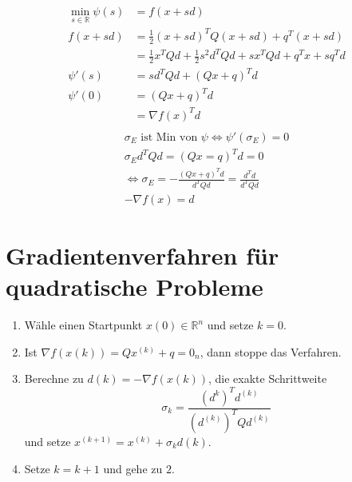 \begin{equation}
\begin{aligned}
	\min_{s\in \mathbb{R}} \psi(s) &= f(x+sd) \\
	f(x+sd) & = \frac{1}{2}(x+sd)^TQ(x+sd)+q^T(x+sd)\\
	& = \frac{1}{2}x^TQd+\frac{1}{2}s^2d^TQd+sx^TQd+q^Tx+sq^Td \\
	\psi'(s) &= sd^TQd+(Qx+q)^Td \\
	\psi'(0)&= (Qx+q)^Td \\ 
	&= \nabla f(x)^Td \\
\end{aligned}
\end{equation}
\begin{equation}
\begin{aligned}
	\sigma_E\text{ ist Min von }\psi \Leftrightarrow \psi'(\sigma_E) = 0\\
	\sigma_Ed^TQd=(Qx=q)^Td = 0 \\
	\Leftrightarrow \sigma_E = - \frac{(Qx+q)^Td}{d^TQd} = \frac{d^Td}{d^TQd}\\
	-\nabla f(x) = d
\end{aligned}
\end{equation}

\section{Gradientenverfahren für quadratische Probleme}
\begin{enumerate}
	\item Wähle einen Startpunkt $x(0) \in \mathbb{R}^n$ und setze $k = 0$.
	\item Ist $\nabla f(x(k)) = Qx^{(k)} + q = 0_n$, dann stoppe das Verfahren.
	\item Berechne zu $d(k) = -\nabla f(x(k))$, die exakte Schrittweite $$\sigma_k = \frac{(d^{k})^Td^{(k)}}{(d^{(k)})^TQd^{(k)}}$$
	und setze $x^{(k+1)} = x^{(k)} + \sigma_kd(k)$.
	\item  Setze $k = k + 1$ und gehe zu $2$.	
\end{enumerate}
